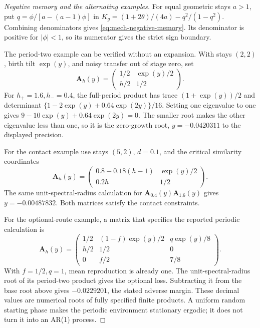 \begin{proof}[Negative memory and the alternating examples]
For equal geometric stays \(a>1\), put \(q=\phi/[a-(a-1)\phi]\) in \(K_g=(1+2\theta)/(4a)-q^2/(1-q^2)\). Combining denominators gives \eqref{eq:mech-negative-memory}. Its denominator is positive for \(|\phi|<1\), so its numerator gives the strict sign boundary.

The period-two example can be verified without an expansion. With stays \((2,2)\), birth tilt \(\exp(y)\), and noisy transfer out of stage zero, set
\[
 \mathbf A_h(y)=\begin{pmatrix}1/2&\exp(y)/2\\h/2&1/2\end{pmatrix}.
\]
For \(h_+=1.6,h_-=0.4\), the full-period product has trace \((1+\exp(y))/2\) and determinant \(\{1-2\exp(y)+0.64\exp(2y)\}/16\). Setting one eigenvalue to one gives
\(9-10\exp(y)+0.64\exp(2y)=0\). The smaller root makes the other eigenvalue less than one, so it is the zero-growth root, \(y=-0.0420311\) to the displayed precision.

For the contact example use stays \((5,2)\), \(d=0.1\), and the critical similarity coordinates
\[
 \mathbf A_h(y)=\begin{pmatrix}0.8-0.18(h-1)&\exp(y)/2\\0.2h&1/2\end{pmatrix}.
\]
The same unit-spectral-radius calculation for \(\mathbf A_{0.4}(y)\mathbf A_{1.6}(y)\) gives \(y=-0.00487832\). Both matrices satisfy the contact constraints.

For the optional-route example, a matrix that specifies the reported periodic calculation is
\[
 \mathbf A_h(y)=\begin{pmatrix}
 1/2&(1-f)\exp(y)/2&q\exp(y)/8\\
 h/2&1/2&0\\0&f/2&7/8
 \end{pmatrix}.
\]
With \(f=1/2,q=1\), mean reproduction is already one. The unit-spectral-radius root of its period-two product gives the optional loss. Subtracting it from the base root above gives \(-0.0229201\), the stated adverse margin. These decimal values are numerical roots of fully specified finite products. A uniform random starting phase makes the periodic environment stationary ergodic; it does not turn it into an AR(1) process.
\end{proof}

